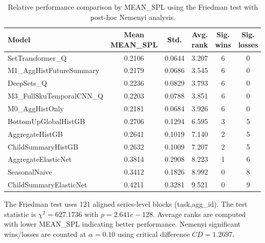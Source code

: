 \begin{table}[H]
\centering
\caption{Relative performance comparison by MEAN_SPL using the Friedman test with post-hoc Nemenyi analysis.}
\label{tab:stats_mean_spl}
\begin{threeparttable}
\begin{tabular}{lccccc}
\toprule
Model & Mean MEAN_SPL & Std. & Avg. rank & Sig. wins & Sig. losses \\
\midrule
SetTransformer\_Q & 0.2106 & 0.0644 & 3.207 & 6 & 0 \\
M1\_AggHistFutureSummary & 0.2179 & 0.0686 & 3.545 & 6 & 0 \\
DeepSets\_Q & 0.2236 & 0.0829 & 3.793 & 6 & 0 \\
M3\_FullSkuTemporalCNN\_Q & 0.2203 & 0.0788 & 3.851 & 6 & 0 \\
M0\_AggHistOnly & 0.2181 & 0.0684 & 3.926 & 6 & 0 \\
BottomUpGlobalHistGB & 0.2706 & 0.1294 & 6.595 & 3 & 5 \\
AggregateHistGB & 0.2641 & 0.1019 & 7.140 & 2 & 5 \\
ChildSummaryHistGB & 0.2632 & 0.1009 & 7.207 & 2 & 5 \\
AggregateElasticNet & 0.3814 & 0.2908 & 8.223 & 1 & 6 \\
SeasonalNaive & 0.3412 & 0.1826 & 8.992 & 0 & 8 \\
ChildSummaryElasticNet & 0.4211 & 0.3281 & 9.521 & 0 & 9 \\
\bottomrule
\end{tabular}
\begin{tablenotes}
\footnotesize \item The Friedman test uses 121 aligned series-level blocks (task,agg\_id). The test statistic is $\chi^2=627.1736$ with $p=2.641e-128$. Average ranks are computed with lower MEAN_SPL indicating better performance. Nemenyi significant wins/losses are counted at $\alpha=0.10$ using critical difference $CD=1.2697$.
\end{tablenotes}
\end{threeparttable}
\end{table}
